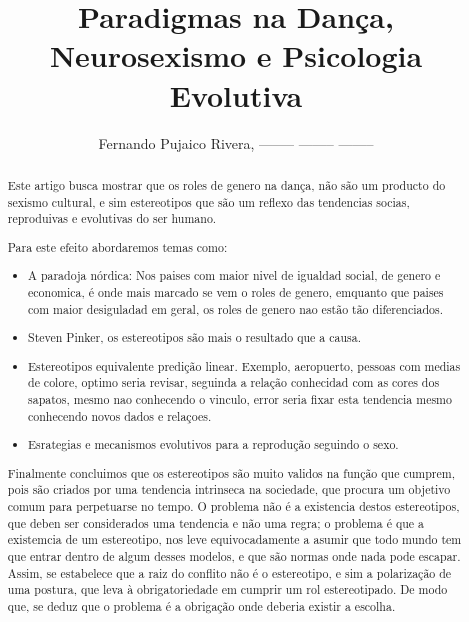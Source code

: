 \documentclass[a4paper,10pt]{article}
\title{Paradigmas na Dança, Neurosexismo e Psicologia Evolutiva}
\author{Fernando Pujaico Rivera, -------- -------- --------}
\begin{document}
\maketitle

\begin{abstract}

Este artigo busca mostrar que os roles de genero na dança,
não são um producto do sexismo cultural, 
e sim estereotipos que são um reflexo das tendencias socias, 
reproduivas e evolutivas do ser humano.

Para este efeito abordaremos temas como:

\begin{itemize}
\item A paradoja nórdica: Nos paises com maior nivel de igualdad social, 
de genero e economica, é onde mais marcado se vem o roles de genero,
emquanto que paises com maior desiguladad em geral,
os roles de genero nao estão tão diferenciados.

\item Steven Pinker, os estereotipos são mais o resultado que a causa.

\item Estereotipos equivalente predição linear. Exemplo, aeropuerto, 
pessoas com medias de colore, optimo seria revisar, seguinda a relação 
conhecidad com as cores dos sapatos, mesmo nao conhecendo o vinculo,
error seria fixar esta tendencia mesmo conhecendo novos dados e relaçoes.

\item Esrategias e mecanismos evolutivos para a reprodução seguindo o sexo.

\end{itemize}
Finalmente concluimos que os estereotipos são muito validos na função que cumprem, 
pois são criados por uma tendencia intrinseca na sociedade,
que procura um objetivo comum para perpetuarse no tempo. 
O problema não é a existencia destos estereotipos, 
que deben ser considerados uma tendencia e não uma regra;
o problema é que a existemcia de um estereotipo, 
nos leve equivocadamente a asumir que todo mundo tem que entrar dentro de algum desses modelos,
e que são normas onde nada pode escapar.
Assim, se estabelece que a raiz do conflito não é o estereotipo, 
e sim a polarização de uma postura, 
que leva à obrigatoriedade em cumprir um rol estereotipado.
De modo que, se deduz que o problema é a obrigação onde deberia existir a escolha.

\end{abstract}
\end{document}
